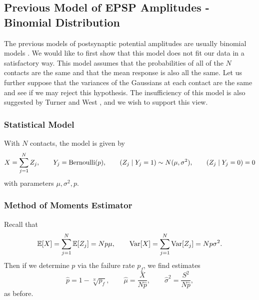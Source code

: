 \documentclass{article}
\begin{document}
\subsection{Previous Model of EPSP Amplitudes - Binomial Distribution}
The previous models of postsynaptic potential amplitudes are usually binomial models \cite{kuhnt1992statistical}. We would like to first show that this model does not fit our data in a satisfactory way. This model assumes that the probabilities of all of the $N$ contacts are the same and that the mean response is also all the same. Let us further suppose that the variances of the Gaussians at each contact are the same and see if we may reject this hypothesis. The insufficiency of this model is also suggested by Turner and West \cite{turner1993bayesian}, and we wish to support this view.

\subsubsection{Statistical Model}
With $N$ contacts, the model is given by
\[
  X = \sum_{j=1}^N Z_j,\qquad Y_j = \operatorname{Bernoulli}(p),\qquad (Z_j\mid Y_j = 1)\sim N(\mu,\sigma^2), \qquad (Z_j\mid Y_j = 0) = 0
\]
with parameters $\mu, \sigma^2, p$.

\subsubsection{Method of Moments Estimator}
Recall that
\[
  \mathbb E[X] = \sum_{j=1}^N \mathbb E[Z_j] = Np\mu, \qquad \operatorname{Var}[X] = \sum_{j=1}^N \operatorname{Var}[Z_j] = Np\sigma^2.
\]
Then if we determine $p$ via the failure rate $p_f$, we find estimates
\[
  \hat p = 1 - \sqrt[N]{p_f}, \qquad \hat\mu = \frac{\overline X}{N\hat p}, \qquad \hat\sigma^2 = \frac{S^2}{N\hat p},
\]
as before.
\end{document}
